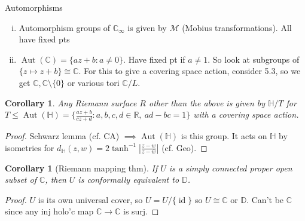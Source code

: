 \documentclass{article}
\theoremstyle{definition}
\theoremstyle{remark}
\theoremstyle{plain}
\newtheorem{crly}[defn]{Corollary}
\newcommand{\RR}{\mathbb{R}}
\newcommand{\CC}{\mathbb{C}}
\newcommand{\id}{\operatorname{id}}
\begin{document}
Automorphisms
\begin{enumerate}[(i)]
    \item Automorphism groups of $\CC_\infty$ is given by $\mathcal M$ (Mobius transformations). All have fixed pts
    \item $\operatorname{Aut}(\CC)=\{az+b:a\neq 0\}$. Have fixed pt if $a\neq 1$. So look at subgroups of $\{z\mapsto z+b\}\cong\CC$. For this to give a covering space action, consider 5.3, so we get $\CC, \CC\setminus\{0\}$ or various tori $\CC/L$.
\end{enumerate}
\begin{crly}
    Any Riemann surface $R$ other than the above is given by $\mathbb H/T$ for $T\le\operatorname{Aut}(\mathbb H)=\{\frac{az+b}{cz+d}:a,b,c,d\in\RR,\ ad-bc=1\}$ with a covering space action.
\end{crly}
\begin{proof}
    Schwarz lemma (cf. CA) $\implies \operatorname{Aut}(\mathbb H)$ is this group. It acts on $\mathbb H$ by isometries for $d_{\mathbb H}(z,w)=2\tanh^{-1}|\frac{z-w}{z-\bar w}|$ (cf. Geo).
\end{proof}
\begin{crly}[Riemann mapping thm]
    If $U$ is a simply connected proper open subset of $\CC$, then $U$ is conformally equivalent to $\mathbb D$.
\end{crly}
\begin{proof}
    $U$ is its own universal cover, so $U=U/\{\id\}$ so $U\cong \CC$ or $\mathbb D$. Can't be $\CC$ since any inj holo'c map $\CC\to\CC$ is surj.
\end{proof}
\end{document}
